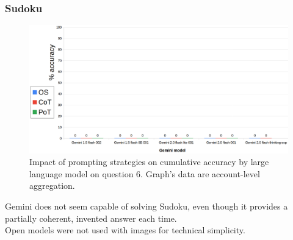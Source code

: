 \documentclass[12pt]{article}
\begin{document}
\subsubsection{Sudoku} %

\begin{figure}[H]
    \centering
            \includegraphics[width=1\textwidth]{q106Gemini.png}
    \caption[Accuracy on Question 6 by LLM]{Impact of prompting strategies on cumulative accuracy by large language model on question 6. Graph's data are account-level aggregation.}
    \end{figure} 
Gemini does not seem capable of solving Sudoku, even though it provides a partially coherent, invented answer each time.\\
Open models were not used with images for technical simplicity.\\
\end{document}
